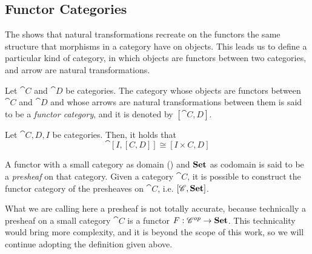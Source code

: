 \subsection{Functor Categories}

The  shows that natural transformations recreate on the functors the same structure that morphisms in a category have on objects. This leads us to define a particular kind of category, in which objects are functors between two categories, and arrow are natural transformations.


\begin{definition}\label{def:functor_category}
    Let $\cat C$ and $\cat D$ be categories. The category whose objects are functors between $\cat C$ and $\cat D$ and whose arrows are natural transformations between them is said to be a \emph{functor category}, and it is denoted by $[\cat{C, D}]$.
\end{definition}

\begin{lemma}\label{lemma:canonical_equiv}
    Let $\cat{C, D, I}$ be categories. Then, it holds that
    \[
        \cat{[I, [C, D]] \cong [I \times C, D]}
    \]
\end{lemma}

A functor with a small category as domain () and $\Set$ as codomain is said to be a \emph{presheaf} on that category. Given a category $\cat C$, it is possible to construct the functor category of the presheaves on $\cat C$, i.e. $[\cat C, \Set]$.

\begin{remark}
    What we are calling here a presheaf is not totally accurate, because technically a presheaf on a small category $\cat C$ is a functor $F: \mathscr{C} ^{op} \rightarrow \mathbf{Set}$. This technicality would bring more complexity, and it is beyond the scope of this work, so we will continue adopting the definition given above.
\end{remark}

\iffalse
\begin{lemma}\label{lemma:limits_of_presheaves}
    Let $\cat C$ be a category, and let $[\cat C, \Set]$ be the category of presheaves on $\cat C$. Let $D: \cat I \to [\cat C, \Set]$ be a diagram of shape $\cat I$ on the presheaves category early mentioned. Then,
    \begin{enumerate}
        \item The limit of $D$ exists, and it is the presheaf $L: \cat C \to \Set$ such that, for each object $A$ of $\cat C$, $L(A)$ is the limit in $\Set$ of the values of the presheaves $D(i)(A)$ for each $i$.
        \item The colimit of $D$ exists, and it is the presheaf $C: \cat C \to \Set$ such that, for each object $A$ of $\cat C$, $C(A)$ is the colimit in $\Set$ of the values of the presheaves $D(i)(A)$, for each $i$.
    \end{enumerate}
\end{lemma}
\fi


